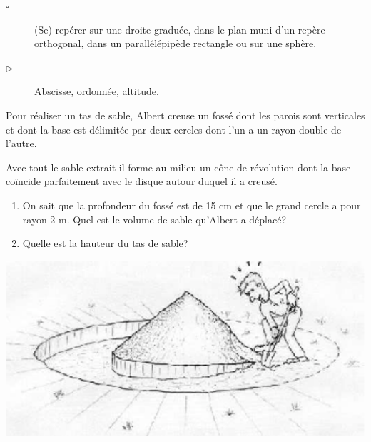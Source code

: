 \documentclass[openany]{book}
\begin{document}
\begin{dtl}

\begin{description}
\item[$\square$] 
(Se) repérer sur une droite graduée, dans le
plan muni d’un repère orthogonal, dans un
parallélépipède rectangle ou sur une sphère.
\item[$\triangleright$] Abscisse, ordonnée, altitude.
\end{description}
\end{dtl}

\Exe



\Exe



\Exe

Pour réaliser un tas de sable, Albert creuse un fossé dont les parois sont verticales et dont la base est délimitée par deux cercles dont l’un a un rayon double de l’autre.

Avec tout le sable extrait il forme au milieu un cône de révolution dont la base coïncide parfaitement avec le disque autour duquel il a creusé.

\begin{minipage}{0.68\linewidth}
\begin{enumerate}
\item On sait que la profondeur du fossé est de 15 cm et que le grand cercle a pour rayon 2 m. Quel est le volume de sable qu’Albert a déplacé?
\item Quelle est la hauteur du tas de sable? 
\end{enumerate}
\end{minipage}
\hfill
\begin{minipage}{0.30\linewidth}
\includegraphics[scale=0.6]{DTL.eps} 
\end{minipage}
\end{document}

